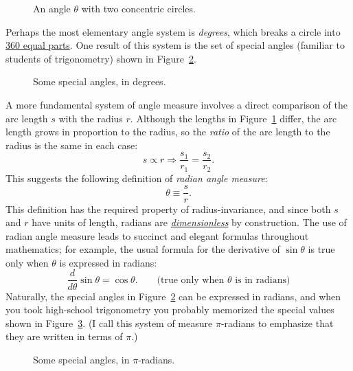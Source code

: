 \begin{figure}
\begin{center}
\end{center}
\caption{An angle $\theta$ with two concentric circles.\label{fig:angle_arclength}}
\end{figure}

Perhaps the most elementary angle system is \emph{degrees}, which breaks a circle into \href{http://www.wonderquest.com/circle.htm}{360 equal parts}. One result of this system is the set of special angles (familiar to students of trigonometry) shown in Figure~\ref{fig:degree_angles}.

\begin{figure}
\begin{center}
\end{center}
\caption{Some special angles, in degrees.\label{fig:degree_angles}}
\end{figure}

A more fundamental system of angle measure involves a direct comparison of the arc length $s$ with the radius $r$. Although the lengths in Figure~\ref{fig:angle_arclength} differ, the arc length grows in proportion to the radius, so the \emph{ratio} of the arc length to the radius is the same in each case:
\[
s\propto r \Rightarrow \frac{s_1}{r_1} = \frac{s_2}{r_2}.
\]
This suggests the following definition of \emph{radian angle measure}:
\[ \theta \equiv \frac{s}{r}. \]
This definition has the required property of radius-invariance, and since both $s$ and $r$ have units of length, radians are \href{http://en.wikipedia.org/wiki/Dimensionless_quantity}{\emph{dimensionless}} by construction. The use of radian angle measure leads to succinct and elegant formulas throughout mathematics; for example, the usual formula for the derivative of $\sin\theta$ is true only when $\theta$ is expressed in radians:
\[
  \frac{d}{d\theta}\sin\theta = \cos\theta. \qquad\mbox{(true only when $\theta$ is in radians)}
\]
Naturally, the special angles in Figure~\ref{fig:degree_angles} can be expressed in radians, and when you took high-school trigonometry you probably memorized the special values shown in Figure~\ref{fig:pi_angles}. (I call this system of measure $\pi$-radians to emphasize that they are written in terms of $\pi$.)

\begin{figure}
\begin{center}
\end{center}
\caption{Some special angles, in $\pi$-radians.\label{fig:pi_angles}}
\end{figure}

